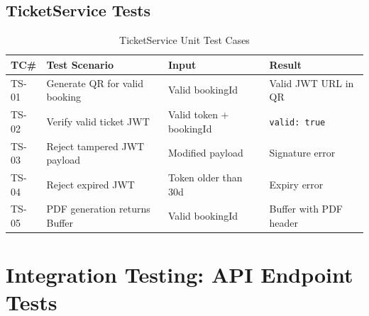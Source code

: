 \documentclass[12pt,a4paper]{report}
\begin{document}
\subsection{TicketService Tests}

\begin{table}[H]
    \centering
    \caption{TicketService Unit Test Cases}
    \vspace{0.2cm}
    \begin{tabular}{|p{1.5cm}|p{5.5cm}|p{4.5cm}|p{2.5cm}|}
        \hline
        \textbf{TC\#} & \textbf{Test Scenario} & \textbf{Input} & \textbf{Result} \\
        \hline
        TS-01 & Generate QR for valid booking & Valid bookingId & Valid JWT URL in QR \\
        \hline
        TS-02 & Verify valid ticket JWT & Valid token + bookingId & \texttt{valid: true} \\
        \hline
        TS-03 & Reject tampered JWT payload & Modified payload & Signature error \\
        \hline
        TS-04 & Reject expired JWT & Token older than 30d & Expiry error \\
        \hline
        TS-05 & PDF generation returns Buffer & Valid bookingId & Buffer with PDF header \\
        \hline
    \end{tabular}
\end{table}

\section{Integration Testing: API Endpoint Tests}
\end{document}
